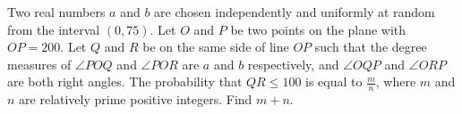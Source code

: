 Two real numbers $a$ and $b$ are chosen independently and uniformly at random from the interval $(0, 75)$. Let $O$ and $P$ be two points on the plane with $OP = 200$. Let $Q$ and $R$ be on the same side of line $OP$ such that the degree measures of $\angle POQ$ and $\angle POR$ are $a$ and $b$ respectively, and $\angle OQP$ and $\angle ORP$ are both right angles. The probability that $QR \leq 100$ is equal to $\frac{m}{n}$, where $m$ and $n$ are relatively prime positive integers. Find $m + n$.